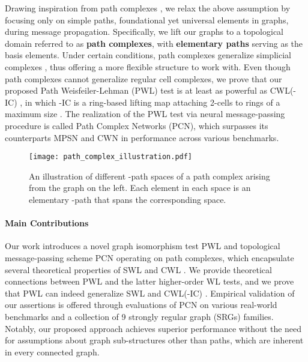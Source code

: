 \documentclass[letterpaper]{article} \usepackage{aaai24}  \usepackage{times}  \usepackage{helvet}  \usepackage{courier}  \usepackage[hyphens]{url}  \usepackage{graphicx} \urlstyle{rm} \def\UrlFont{\rm}  \usepackage{natbib}  \usepackage{caption} \frenchspacing  \setlength{\pdfpagewidth}{8.5in} \setlength{\pdfpageheight}{11in} \usepackage{algorithm}
\begin{document}
Drawing inspiration from path complexes  \cite{grigoryan_path_2020, grigoryan_homologies_2013}, we relax the above assumption by focusing only on simple paths, foundational yet universal elements in graphs, during message propagation. Specifically, we lift our graphs to a topological domain referred to as \textbf{path complexes}, with \textbf{elementary paths} serving as the basis elements. Under certain conditions, path complexes generalize simplicial complexes \cite{grigoryan_homologies_2013, grigoryan_path_2020}, thus offering a more flexible structure to work with. Even though path complexes cannot generalize regular cell complexes, we prove that our proposed Path Weisfeiler-Lehman (PWL) test is at least as powerful as CWL(-IC) \cite{bodnar_weisfeiler_2022}, in which -IC is a ring-based lifting map attaching 2-cells to rings of a maximum size . The realization of the PWL test via neural message-passing procedure \cite{gilmer_neural_2017} is called Path Complex Networks (PCN), which surpasses its counterparts MPSN \cite{bodnar_weisfeiler_2021} and CWN \cite{bodnar_weisfeiler_2022} in performance across various benchmarks.



\begin{figure}[t]
    \centering
    \texttt{[image: path\_complex\_illustration.pdf]}
    \caption{An illustration of different -path spaces of a path complex arising from the graph on the left. Each element in each space is an elementary -path that spans the corresponding space.}
    \label{fig:p_path_spaces}
\end{figure}



\paragraph{Main Contributions} Our work introduces a novel graph isomorphism test PWL and topological message-passing scheme PCN operating on path complexes, which encapsulate several theoretical properties of SWL \cite{bodnar_weisfeiler_2021} and CWL \cite{bodnar_weisfeiler_2022}. We provide theoretical connections between PWL and the latter higher-order WL tests, and we prove that PWL can indeed generalize SWL \cite{bodnar_weisfeiler_2021} and CWL(-IC) \cite{bodnar_weisfeiler_2022}. Empirical validation of our assertions is offered through evaluations of PCN on various real-world benchmarks and a collection of 9 strongly regular graph (SRGs) families. Notably, our proposed approach achieves superior performance without the need for assumptions about graph sub-structures other than paths, which are inherent in every connected graph.
\end{document}
